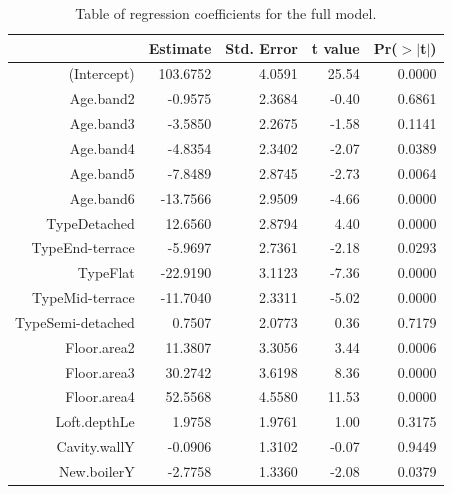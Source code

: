 \documentclass[9pt]{extarticle}
\begin{document}
\begin{table}[ht]
	\centering
	\begin{tabular}{rrrrr}
		\hline
		& Estimate & Std. Error & t value & Pr($>$$|$t$|$) \\ 
		\hline
		(Intercept) & 103.6752 & 4.0591 & 25.54 & 0.0000 \\ 
		Age.band2 & -0.9575 & 2.3684 & -0.40 & 0.6861 \\ 
		Age.band3 & -3.5850 & 2.2675 & -1.58 & 0.1141 \\ 
		Age.band4 & -4.8354 & 2.3402 & -2.07 & 0.0389 \\ 
		Age.band5 & -7.8489 & 2.8745 & -2.73 & 0.0064 \\ 
		Age.band6 & -13.7566 & 2.9509 & -4.66 & 0.0000 \\ 
		TypeDetached & 12.6560 & 2.8794 & 4.40 & 0.0000 \\ 
		TypeEnd-terrace & -5.9697 & 2.7361 & -2.18 & 0.0293 \\ 
		TypeFlat & -22.9190 & 3.1123 & -7.36 & 0.0000 \\ 
		TypeMid-terrace & -11.7040 & 2.3311 & -5.02 & 0.0000 \\ 
		TypeSemi-detached & 0.7507 & 2.0773 & 0.36 & 0.7179 \\ 
		Floor.area2 & 11.3807 & 3.3056 & 3.44 & 0.0006 \\ 
		Floor.area3 & 30.2742 & 3.6198 & 8.36 & 0.0000 \\ 
		Floor.area4 & 52.5568 & 4.5580 & 11.53 & 0.0000 \\ 
		Loft.depthLe & 1.9758 & 1.9761 & 1.00 & 0.3175 \\ 
		Cavity.wallY & -0.0906 & 1.3102 & -0.07 & 0.9449 \\ 
		New.boilerY & -2.7758 & 1.3360 & -2.08 & 0.0379 \\ 
		\hline
	\end{tabular}
\caption{Table of regression coefficients for the full model.}
\label{tab:fulmo}
\end{table}
\end{document}
